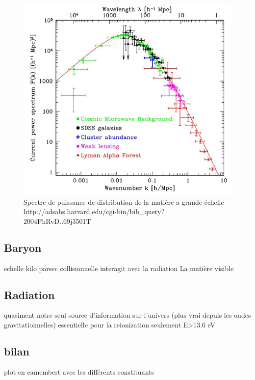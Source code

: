 \begin{figure}[bth]
        \includegraphics[width=.95\linewidth]{img/01/matter_power_spectrum.jpeg} 
        \caption{Spectre de puissance de distribution de la matière a grande échelle
        http://adsabs.harvard.edu/cgi-bin/bib_query?2004PhRvD..69j3501T}
 		\label{fig:matter_power_spectrum}
\end{figure}



\subsection{Baryon}

echelle kilo parsec
collisionnelle
interagit avec la radiation
La matière visible

\subsection{Radiation}

quasiment notre seul source d'information sur l'univers (plus vrai depuis les ondes gravitationnelles)
essentielle pour la reionization
seulement E>13.6 eV

\subsection{bilan}

plot en camembert avec les différents constituants






